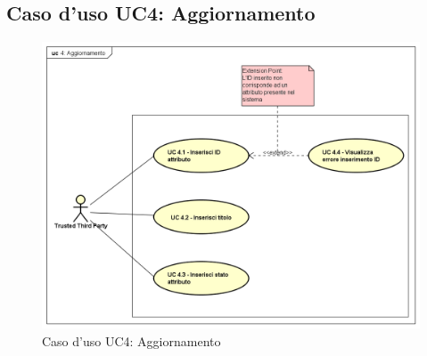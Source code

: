 \subsection{Caso d'uso UC4: Aggiornamento}
\begin{figure}[h]
	\centering
	\includegraphics[scale=0.50]{immagini/usecase/UC4_Aggiornamento}
	\caption{Caso d'uso UC4: Aggiornamento}
\end{figure}
